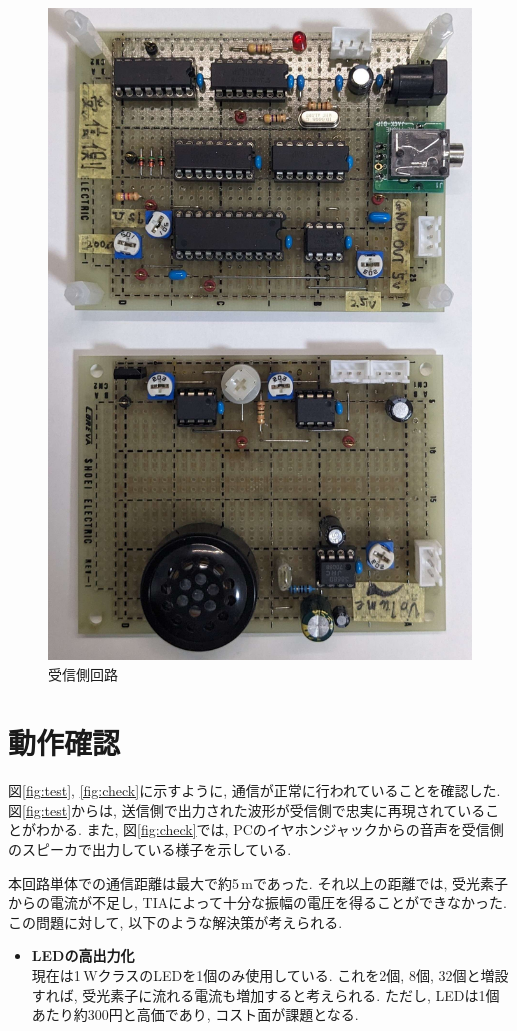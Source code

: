 \documentclass[a4paper,10pt]{article}
\begin{document}
\begin{multicols}{2}[\raggedcolumns]
\begin{figure}[H]
    \centering
    \includegraphics[width=0.8\linewidth]{figure/jusin.jpg} 
    \caption{受信側回路} 
    \label{fig:jusin}
\end{figure}

\section{動作確認}
図\ref{fig:test}, \ref{fig:check}に示すように, 通信が正常に行われていることを確認した.  
図\ref{fig:test}からは, 送信側で出力された波形が受信側で忠実に再現されていることがわかる.  
また, 図\ref{fig:check}では, PCのイヤホンジャックからの音声を受信側のスピーカで出力している様子を示している.  

本回路単体での通信距離は最大で約5\,mであった.  
それ以上の距離では, 受光素子からの電流が不足し, TIAによって十分な振幅の電圧を得ることができなかった.  
この問題に対して, 以下のような解決策が考えられる.  

\begin{itemize}
\item
  \textbf{LEDの高出力化}\\
  現在は1\,WクラスのLEDを1個のみ使用している.  
  これを2個, 8個, 32個と増設すれば, 受光素子に流れる電流も増加すると考えられる.  
  ただし, LEDは1個あたり約300円と高価であり, コスト面が課題となる.  


\end{itemize}
\end{multicols}
\end{document}
